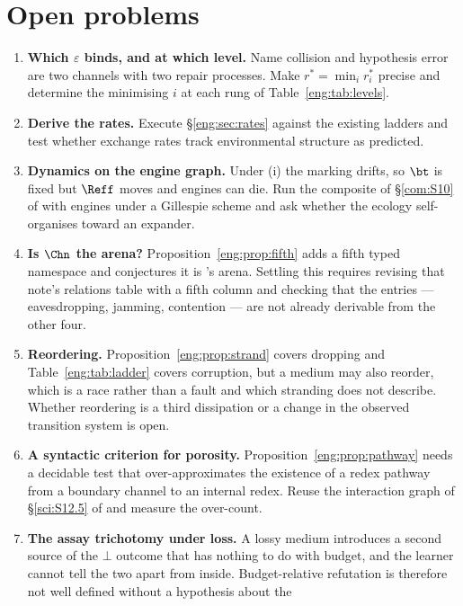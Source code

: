 \section{Open problems}\label{eng:S14}
\label{eng:sec:open}

\begin{enumerate}[itemsep=4pt]
\item \textbf{Which $\varepsilon$ binds, and at which level.} Name
collision and hypothesis error are two channels with two repair processes.
Make $r^\ast = \min_i r^\ast_i$ precise and determine the minimising $i$ at
each rung of Table~\ref{eng:tab:levels}.
\item \textbf{Derive the rates.} Execute \S\ref{eng:sec:rates} against the
existing ladders and test whether exchange rates track environmental
structure as predicted.
\item \textbf{Dynamics on the engine graph.} Under (i) the marking drifts,
so $\bt$ is fixed but $\Reff$ moves and engines can die. Run the composite
of \S\ref{com:S10} of \chComp with engines under a Gillespie scheme and ask
whether the ecology self-organises toward an expander.
\item \textbf{Is $\Chn$ the arena?} Proposition~\ref{eng:prop:fifth} adds a
fifth typed namespace and conjectures it is \chComp's arena.
Settling this requires revising that note's relations table with a fifth
column and checking that the entries --- eavesdropping, jamming,
contention --- are not already derivable from the other four.
\item \textbf{Reordering.} Proposition~\ref{eng:prop:strand} covers dropping
and Table~\ref{eng:tab:ladder} covers corruption, but a medium may also
reorder, which is a race rather than a fault and which stranding does not
describe. Whether reordering is a third dissipation or a change in the
observed transition system is open.
\item \textbf{A syntactic criterion for porosity.}
Proposition~\ref{eng:prop:pathway} needs a decidable test that
over-approximates the existence of a redex pathway from a boundary
channel to an internal redex. Reuse the interaction graph of
\S\ref{sci:S12.5} of \chSci and measure the over-count.
\item \textbf{The assay trichotomy under loss.} A lossy medium introduces
a second source of the $\bot$ outcome that has nothing to do with budget,
and the learner cannot tell the two apart from inside. Budget-relative
refutation is therefore not well defined without a hypothesis about the

\end{enumerate}
